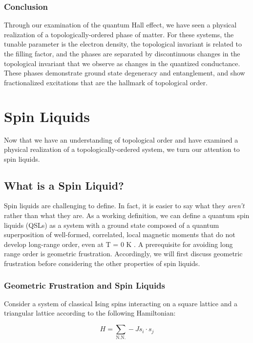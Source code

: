 \subsubsection{Conclusion}

Through our examination of the quantum Hall effect, we have seen a physical realization of a topologically-ordered phase of matter.  For these systems, the tunable parameter is the electron density, the topological invariant is related to the filling factor, and the phases are separated by discontinuous changes in the topological invariant that we observe as changes in the quantized conductance. These phases demonstrate ground state degeneracy and entanglement, and show fractionalized excitations that are the hallmark of topological order.

\section{Spin Liquids}

Now that we have an understanding of topological order and have examined a physical realization of a topologically-ordered system, we turn our attention to spin liquids.

\subsection{What is a Spin Liquid?}

Spin liquids are challenging to define. In fact, it is easier to say what they \textit{aren't} rather than what they are. As a working definition, we can define a quantum spin liquids (QSLs) as a system with a ground state composed of a quantum superposition of well-formed, correlated, local magnetic moments that do not develop long-range order, even at T = 0 K \cite{Balents2010}. A prerequisite for avoiding long range order is geometric frustration. Accordingly, we will first discuss geometric frustration before considering the other properties of spin liquids.

\subsubsection{Geometric Frustration and Spin Liquids}

Consider a system of classical Ising spins interacting on a square lattice and a triangular lattice according to the following Hamiltonian: 

\begin{equation}
H = \sum_{\text{N.N.}} -J s_{i} \cdot s_{j}
\end{equation}

